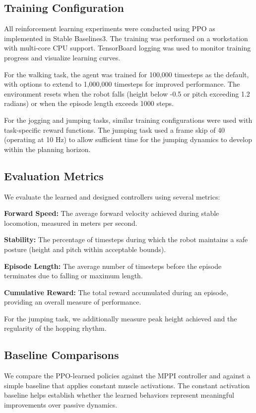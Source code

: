 \documentclass[conference]{IEEEtran}
\begin{document}
\subsection{Training Configuration}

All reinforcement learning experiments were conducted using PPO as implemented in Stable Baselines3. The training was performed on a workstation with multi-core CPU support. TensorBoard logging was used to monitor training progress and visualize learning curves.

For the walking task, the agent was trained for 100,000 timesteps as the default, with options to extend to 1,000,000 timesteps for improved performance. The environment resets when the robot falls (height below -0.5 or pitch exceeding 1.2 radians) or when the episode length exceeds 1000 steps.

For the jogging and jumping tasks, similar training configurations were used with task-specific reward functions. The jumping task used a frame skip of 40 (operating at 10 Hz) to allow sufficient time for the jumping dynamics to develop within the planning horizon.

\subsection{Evaluation Metrics}

We evaluate the learned and designed controllers using several metrics:

\textbf{Forward Speed:} The average forward velocity achieved during stable locomotion, measured in meters per second.

\textbf{Stability:} The percentage of timesteps during which the robot maintains a safe posture (height and pitch within acceptable bounds).

\textbf{Episode Length:} The average number of timesteps before the episode terminates due to falling or maximum length.

\textbf{Cumulative Reward:} The total reward accumulated during an episode, providing an overall measure of performance.

For the jumping task, we additionally measure peak height achieved and the regularity of the hopping rhythm.

\subsection{Baseline Comparisons}

We compare the PPO-learned policies against the MPPI controller and against a simple baseline that applies constant muscle activations. The constant activation baseline helps establish whether the learned behaviors represent meaningful improvements over passive dynamics.
\end{document}
